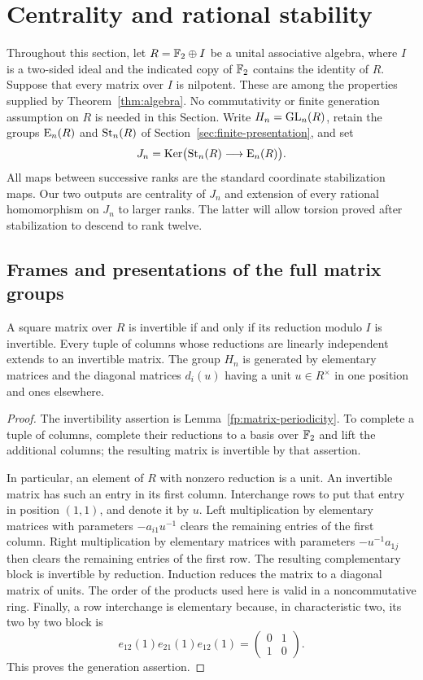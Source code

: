 \section{Centrality and rational stability}\label{sec:stability}

Throughout this section, let $R=\mathbb F_2\oplus I$ be a unital associative
algebra, where $I$ is a two-sided ideal and the indicated copy of
$\mathbb F_2$ contains the identity of $R$. Suppose that every matrix over
$I$ is nilpotent. These are among the
properties supplied by Theorem~\ref{thm:algebra}. No commutativity or finite
generation assumption on $R$ is needed in this Section. Write
$H_n=\operatorname{GL}_n(R)$, retain the groups $\operatorname{E}_n(R)$ and $\operatorname{St}_n(R)$ of
Section~\ref{sec:finite-presentation}, and set
\[
 J_n=\operatorname{Ker}\bigl(\operatorname{St}_n(R)\longrightarrow\operatorname{E}_n(R)\bigr).
\]
All maps between successive ranks are the standard coordinate
stabilization maps.
Our two outputs are centrality of $J_n$ and extension of every rational
homomorphism on $J_n$ to larger ranks. The latter will allow torsion
proved after stabilization to descend to rank twelve.

\subsection{Frames and presentations of the full matrix groups}

\begin{lemma}\label{st:linear-algebra}
A square matrix over $R$ is invertible if and only if its reduction modulo
$I$ is invertible. Every tuple of columns whose reductions are linearly
independent extends to an invertible matrix. The group $H_n$ is generated
by elementary matrices and the diagonal matrices $d_i(u)$ having a unit
$u\in R^\times$ in one position and ones elsewhere.
\end{lemma}

\begin{proof}
The invertibility assertion is Lemma~\ref{fp:matrix-periodicity}.
To complete a tuple of columns, complete their reductions to a basis
over $\mathbb F_2$ and lift the additional columns; the resulting matrix is
invertible by that assertion.

In particular, an element of $R$ with nonzero reduction is a unit. An
invertible matrix has such an entry in its first column. Interchange
rows to put that entry in position $(1,1)$, and denote it by $u$.
Left multiplication by elementary matrices with parameters
$-a_{i1}u^{-1}$ clears the remaining entries of the first column.
Right multiplication by elementary matrices with parameters
$-u^{-1}a_{1j}$ then clears the remaining entries of the first row.
The resulting complementary block is invertible by reduction. Induction
reduces the matrix to a diagonal matrix of units. The order of the
products used here is valid in a noncommutative ring. Finally, a row
interchange is elementary because, in characteristic two, its two by two
block is
\[
 e_{12}(1)e_{21}(1)e_{12}(1)=
 \begin{pmatrix}0&1\\1&0\end{pmatrix}.
\]
This proves the generation assertion.
\end{proof}

